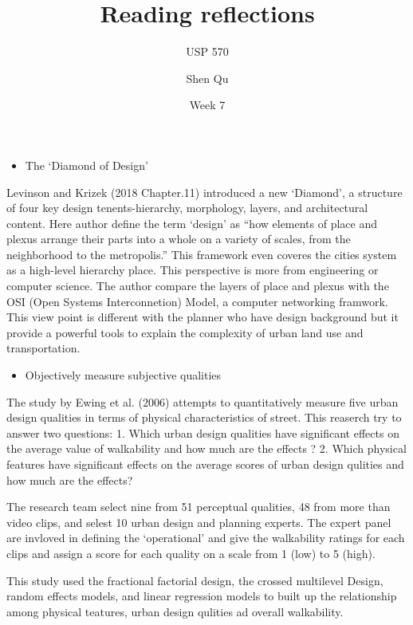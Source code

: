 \documentclass[12pt,]{article}
\title{Reading reflections}
\subtitle{USP 570}
\author{Shen Qu}
\date{Week 7}
\providecommand{\tightlist}{%
  \setlength{\itemsep}{0pt}\setlength{\parskip}{0pt}}
\begin{document}
\maketitle

\begin{itemize}
\tightlist
\item
  The `Diamond of Design'
\end{itemize}

Levinson and Krizek (2018 Chapter.11) introduced a new `Diamond', a
structure of four key design tenents-hierarchy, morphology, layers, and
architectural content. Here author define the term `design' as ``how
elements of place and plexus arrange their parts into a whole on a
variety of scales, from the neighborhood to the metropolis.'' This
framework even coveres the cities system as a high-level hierarchy
place. This perspective is more from engineering or computer science.
The author compare the layers of place and plexus with the OSI (Open
Systems Interconnetion) Model, a computer networking framwork. This view
point is different with the planner who have design background but it
provide a powerful tools to explain the complexity of urban land use and
transportation.

\begin{itemize}
\tightlist
\item
  Objectively measure subjective qualities
\end{itemize}

The study by Ewing et al. (2006) attempts to quantitatively measure five
urban design qualities in terms of physical characteristics of street.
This reaserch try to answer two questions: 1. Which urban design
qualities have significant effects on the average value of walkability
and how much are the effects ? 2. Which physical features have
significant effects on the average scores of urban design qulities and
how much are the effects?

The research team select nine from 51 perceptual qualities, 48 from more
than video clips, and selest 10 urban design and planning experts. The
expert panel are invloved in defining the `operational' and give the
walkability ratings for each clips and assign a score for each quality
on a scale from 1 (low) to 5 (high).

This study used the fractional factorial design, the crossed multilevel
Design, random effects models, and linear regression models to built up
the relationship among physical teatures, urban design qulities ad
overall walkability.
\end{document}

